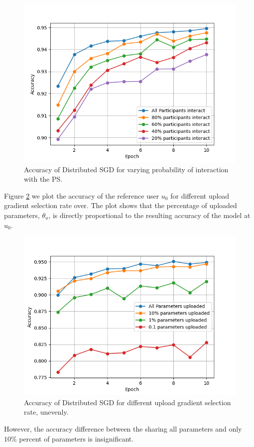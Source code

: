 \documentclass[letterpaper]{article}
\begin{document}
\begin{flushleft}
{\begin{figure}[H]
  \centering
    \includegraphics[width=5in]{VaryingProbabilityInteractionGrid.png}
    \caption[SGD for varying probability of interaction.]{\label{fig:VaryingProbabilityInteraction} Accuracy of Distributed SGD for varying probability of interaction with the PS.}
  \end{figure}




Figure \ref{fig:VaryingThetaU} we plot the accuracy of the reference user $u_0$ for different upload gradient selection rate over. 
The plot shows that the percentage of uploaded parameters, $\theta_u$, is directly proportional to the resulting accuracy of
the model at $u_0$. 

\begin{figure}[H]
  \centering
    \includegraphics[width=5in]{VaryingThetaUGrid.png}
    \caption[Varying upload gradient selection rate]{\label{fig:VaryingThetaU}Accuracy of Distributed SGD for different upload gradient selection rate, unevenly.}
  \end{figure}
However, the accuracy difference between the sharing all parameters and only $ 10\% $ percent of parameters is
insignificant.

}
\end{flushleft}
\end{document}
